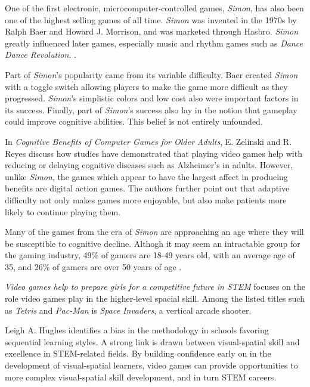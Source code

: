 One of the first electronic, microcomputer-controlled games, \textit{Simon},
has also been one of the highest selling games of all time.  \textit{Simon}
was invented in the 1970s by Ralph Baer and Howard J. Morrison, and
was marketed through Hasbro.  \textit{Simon} greatly influenced later games,
especially music and rhythm games such as \textit{Dance Dance Revolution}.
\citep{austin2016}.

Part of \textit{Simon}'s popularity came from its variable difficulty.  Baer
created \textit{Simon} with a toggle switch allowing players to make the game
more difficult as they progressed.  \textit{Simon}'s simplistic colors and low
cost also were important factors in its success.  Finally, part of
\textit{Simon}'s success also lay in the notion that gameplay could improve
cognitive abilities.  This belief is not entirely unfounded.

In \textit{Cognitive Benefits of Computer Games for Older Adults},
E. Zelinski and R. Reyes discuss how studies have demonstrated that playing video
games help with reducing or delaying cognitive diseases such as
Alzheimer’s in adults.  However, unlike \textit{Simon}, the games which appear
to have the largest affect in producing benefits are digital action games.
The authors further point out that adaptive difficulty not only makes
games more enjoyable, but also make patients more likely to continue
playing them.

Many of the games from the era of \textit{Simon} are approaching an age
where they will be susceptible to cognitive decline.  Althogh it
may seem an intractable group for the gaming industry, 49\% of gamers
are 18-49 years old, with an average age of 35, and 26\% of gamers are
over 50 years of age \citep{zelinski2009}.

\textit{Video games help to prepare girls for a competitive future in STEM} focuses on
the role video games play in the higher-level spacial skill. Among the listed
titles such as \textit{Tetris} and \textit{Pac-Man} is \textit{Space Invaders}, 
a vertical arcade shooter.\citep{Hughes2017}

Leigh A. Hughes identifies a bias in the methodology in schools favoring 
sequential learning styles. A strong link is drawn between visual-spatial skill
and excellence in STEM-related fields. By building confidence early on in the
development of visual-spatial learners, video games can provide opportunities
to more complex visual-spatial skill development, and in turn STEM careers.


